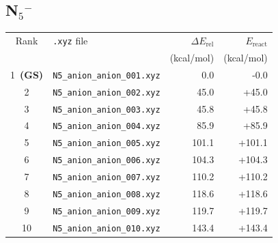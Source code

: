\documentclass[11pt,a4paper]{article}
\begin{document}
\subsection*{N$_{5}$$^{-}$}
\begin{longtable}{clrr}
\toprule
Rank & \texttt{.xyz} file & $\Delta E_\text{rel}$ & $E_\text{react}$ \\
 & & (kcal/mol) & (kcal/mol) \\
\midrule\endhead
\rowcolor{gs}1~\textbf{(GS)} & \texttt{N5\_anion\_anion\_001.xyz} & 0.0 & -0.0 \\
2 & \texttt{N5\_anion\_anion\_002.xyz} & 45.0 & +45.0 \\
3 & \texttt{N5\_anion\_anion\_003.xyz} & 45.8 & +45.8 \\
4 & \texttt{N5\_anion\_anion\_004.xyz} & 85.9 & +85.9 \\
5 & \texttt{N5\_anion\_anion\_005.xyz} & 101.1 & +101.1 \\
6 & \texttt{N5\_anion\_anion\_006.xyz} & 104.3 & +104.3 \\
7 & \texttt{N5\_anion\_anion\_007.xyz} & 110.2 & +110.2 \\
8 & \texttt{N5\_anion\_anion\_008.xyz} & 118.6 & +118.6 \\
9 & \texttt{N5\_anion\_anion\_009.xyz} & 119.7 & +119.7 \\
10 & \texttt{N5\_anion\_anion\_010.xyz} & 143.4 & +143.4 \\
\bottomrule
\end{longtable}
\end{document}
